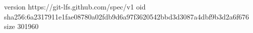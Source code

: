 version https://git-lfs.github.com/spec/v1
oid sha256:6a2317911e1fae08780a02fdb9d6a97f3620542bbd3d3087a4dbf9b3d2a6f676
size 301960
